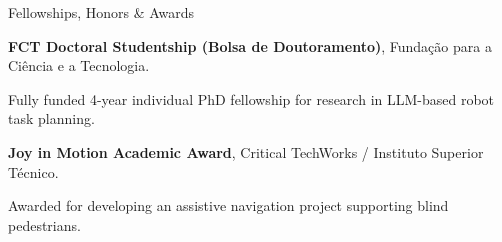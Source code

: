 \begin{rubric}{Fellowships, Honors \& Awards}

\entry*[2025 -- 2029]
	\textbf{FCT Doctoral Studentship (Bolsa de Doutoramento)}, Fundação para a Ciência e a Tecnologia.
	\par
	\small Fully funded 4-year individual PhD fellowship for research in LLM-based robot task planning.

\entry*[2024]
	\textbf{Joy in Motion Academic Award}, Critical TechWorks / Instituto Superior Técnico.
	\par
	\small Awarded for developing an assistive navigation project supporting blind pedestrians.

\end{rubric}